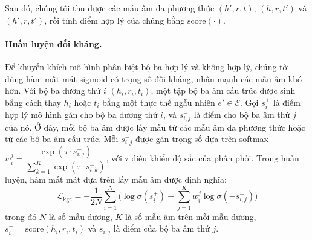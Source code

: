 \documentclass[10pt,twocolumn,a4paper]{article}
\newcommand{\score}{\mathrm{score}}
\begin{document}
Sau đó, chúng tôi thu được các mẫu âm đa phương thức $(h', r, t)$, $(h, r, t')$ và $(h', r, t')$, rồi tính điểm hợp lý của chúng bằng $\score(\cdot)$.

\paragraph{Huấn luyện đối kháng.}
Để khuyến khích mô hình phân biệt bộ ba hợp lý và không hợp lý, chúng tôi dùng hàm mất mát sigmoid có trọng số đối kháng, nhấn mạnh các mẫu âm khó hơn. Với bộ ba dương thứ $i$ $(h_i, r_i, t_i)$, một tập bộ ba âm cấu trúc được sinh bằng cách thay $h_i$ hoặc $t_i$ bằng một thực thể ngẫu nhiên $e' \in \mathcal{E}$. Gọi $s^+_i$ là điểm hợp lý mô hình gán cho bộ ba dương thứ $i$, và $s^-_{i,j}$ là điểm cho bộ ba âm thứ $j$ của nó. Ở đây, mỗi bộ ba âm được lấy mẫu từ các mẫu âm đa phương thức hoặc từ các bộ ba âm cấu trúc. Mỗi $s^-_{i,j}$ được gán trọng số dựa trên softmax $w^j_i = \dfrac{\exp(\tau\cdot s^-_{i,j})}{\sum_{k=1}^{K}\exp(\tau\cdot s^-_{i,k})}$, với $\tau$ điều khiển độ sắc của phân phối. Trong huấn luyện, hàm mất mát dựa trên lấy mẫu âm được định nghĩa:
\begin{equation}
\mathcal{L}_{\mathrm{kgc}} = -\frac{1}{2N}\sum_{i=1}^{N}\Bigg(\log\sigma(s^+_i) + \sum_{j=1}^{K} w^j_i\log\sigma(-s^-_{i,j})\Bigg)
\label{eq:12}
\end{equation}
trong đó $N$ là số mẫu dương, $K$ là số mẫu âm trên mỗi mẫu dương, $s^+_i = \score(h_i, r_i, t_i)$ và $s^-_{i,j}$ là điểm của bộ ba âm thứ $j$.
\end{document}
